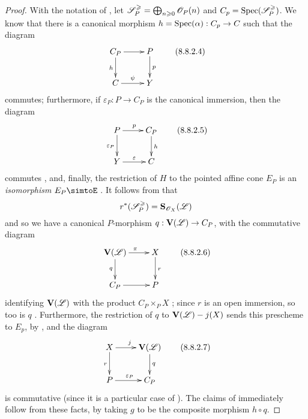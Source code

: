 \begin{proof}
With the notation of , let $\mathscr{S}_P^\geqslant = \bigoplus_{n\geqslant0}\mathscr{O}_P(n)$ and $C_p=\operatorname{Spec}(\mathscr{S}_P^\geqslant)$.
We know  that there is a canonical morphism $h=\Spec(\alpha):C_p\to C$ such that the diagram
\[
\label{II.8.8.2.4}
  \xymatrix{
    C_P
      \ar[r]
      \ar[d]_{h}
  & P
      \ar[d]^{p}
  \\C
      \ar[r]^{\psi}
  & Y
  }
\tag{8.8.2.4}
\]
commutes; furthermore, if $\varepsilon_P:P\to C_P$ is the canonical immersion, then the diagram
\[
\label{II.8.8.2.5}
  \xymatrix{
    P
      \ar[r]^{p}
      \ar[d]_{\varepsilon_P}
  & C_P
      \ar[d]^{h}
  \\Y
      \ar[r]^{\varepsilon}
  & C
  }
\tag{8.8.2.5}
\]
commutes , and, finally, the restriction of $H$ to the pointed affine cone $E_P$ is an \emph{isomorphism} $E_P\simtoE$ .
It follows from  that
\[
  r^*(\mathscr{S}_P^\geqslant)=\mathbf{S}_{\mathscr{O}_X}(\mathscr{L})
\]
and so we have a canonical $P$-morphism $q:\bb{V}(\sh{L})\to C_P$, with the commutative diagram
\[
\label{II.8.8.2.6}
  \xymatrix{
    \bb{V}(\sh{L})
      \ar[r]^{\pi}
      \ar[d]_{q}
  & X
      \ar[d]^{r}
  \\C_P
      \ar[r]
  & P
  }
\tag{8.8.2.6}
\]
identifying $\mathbf{V}(\mathscr{L})$ with the product $C_P\times_P X$ ;
since $r$ is an open immersion, so too is $q$ .
Furthermore, the restriction of $q$ to $\mathbf{V}(\mathscr{L})- j(X)$ sends this prescheme to $E_p$, by , and the diagram
\[
\label{II.8.8.2.7}
  \xymatrix{
    X
      \ar[r]^{j}
      \ar[d]_{r}
  & \bb{V}(\sh{L})
      \ar[d]^{q}
  \\P
      \ar[r]^{\varepsilon_P}
  & C_P
  }
\tag{8.8.2.7}
\]
is commutative (since it is a particular case of ).
The claims of  immediately follow from these facts, by taking $g$ to be the composite morphism $h\circ q$.
\end{proof}

